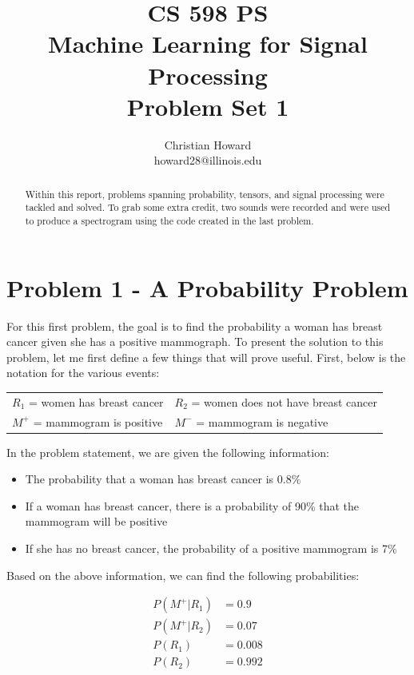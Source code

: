 \documentclass{article}[12pt]
\title{CS 598 PS \\ Machine Learning for Signal Processing \\ Problem Set 1}
\author{
Christian Howard \\ howard28@illinois.edu
}
\date{} %
\begin{document}
   
   \maketitle
   \begin{abstract}
   Within this report, problems spanning probability, tensors, and signal processing were tackled and solved. To grab some extra credit, two sounds were recorded and were used to produce a spectrogram using the code created in the last problem. 
   \end{abstract}
   \newpage
   
   \tableofcontents
   \newpage
   
   \section{Problem 1 - A Probability Problem}
   For this first problem, the goal is to find the probability a woman has breast cancer given she has a positive mammograph. To present the solution to this problem, let me first define a few things that will prove useful. First, below is the notation for the various events:
   
   \vspace{10pt}
   \begin{tabular}{l l}
   $R_1$ = women has breast cancer & $R_2$ = women does not have breast cancer \\
   $M^{+}$ = mammogram is positive & $M^{-}$ = mammogram is negative
   \end{tabular}
   \vspace{10pt}   
   
   In the problem statement, we are given the following information:
   
   \begin{itemize}
   \item The probability that a woman has breast cancer is 0.8\%
   \item If a woman has breast cancer, there is a probability of 90\% that the mammogram will be positive
   \item If she has no breast cancer, the probability of a positive mammogram is 7\%
   \end{itemize}
   
   Based on the above information, we can find the following probabilities:
   
   \begin{align*}
   P(M^{+} | R_1) &= 0.9 \\
   P(M^{+} | R_2) &= 0.07 \\
   P(R_1) &= 0.008 \\
   P(R_2) &= 0.992
   \end{align*}
   
\end{document}
